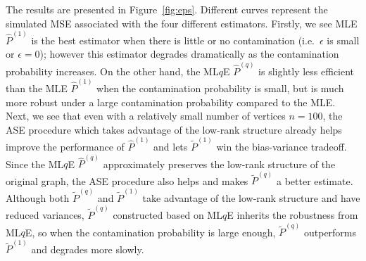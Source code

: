 The results are presented in Figure~\ref{fig:eps}. Different curves represent the simulated MSE associated with the four different estimators.
Firstly, we see MLE $\hat{P}^{(1)}$ is the best estimator when there is little or no contamination (i.e.\ $\epsilon$ is small or $\epsilon = 0$); however this estimator degrades dramatically as the contamination probability increases. On the other hand, the ML$q$E $\hat{P}^{(q)}$ is slightly less efficient than the MLE $\hat{P}^{(1)}$ when the contamination probability is small, but is much more robust under a large contamination probability compared to the MLE.
Next, we see that even with a relatively small number of vertices $n = 100$, the ASE procedure which takes advantage of the low-rank structure already helps improve the performance of $\hat{P}^{(1)}$ and lets $\widetilde{P}^{(1)}$ win the bias-variance tradeoff. Since the ML$q$E $\hat{P}^{(q)}$ approximately preserves the low-rank structure of the original graph, the ASE procedure also helps and makes $\widetilde{P}^{(q)}$ a better estimate. Although both $\widetilde{P}^{(q)}$ and $\widetilde{P}^{(1)}$ take advantage of the low-rank structure and have reduced variances, $\widetilde{P}^{(q)}$ constructed based on ML$q$E inherits the robustness from ML$q$E, so when the contamination probability is large enough, $\widetilde{P}^{(q)}$ outperforms $\widetilde{P}^{(1)}$ and degrades more slowly.

